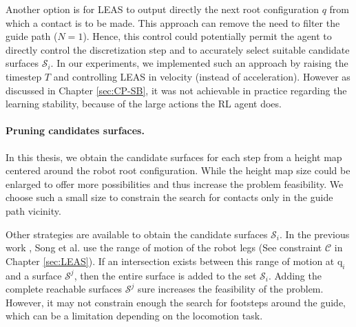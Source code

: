 Another option is for LEAS to output directly the next root configuration $q$ from which a contact is to be made.
This approach can remove the need to filter the guide path ($N=1$).
Hence, this control could potentially permit the agent to directly control the discretization step and to accurately select suitable candidate surfaces $\mathcal{S}_i$.
In our experiments, we implemented such an approach by raising the timestep $T$ and controlling LEAS in velocity (instead of acceleration). 
However as discussed in Chapter \ref{sec:CP-SB}, it was not achievable in practice regarding the learning stability, because of the large actions the RL agent does.

\paragraph{Pruning candidates surfaces.\label{subsub:mip:discussion:candidate_surfaces}}
In this thesis, we obtain the candidate surfaces for each step from a height map centered around the robot root configuration. While the height map size could be enlarged to offer more possibilities and thus increase the problem feasibility.
We choose such a small size to constrain the search for contacts only in the guide path vicinity.

Other strategies are available to obtain the candidate surfaces $\mathcal{S}_i$.
In the previous work \cite{sl1m_v2}, Song et al. use the range of motion of the robot legs (See constraint $\mathcal{C}$ in Chapter \ref{sec:LEAS}).
If an intersection exists between this range of motion at $\mbox{q}_i$ and a surface $\mathcal{S}^j$, then the entire surface is added to the set $\mathcal{S}_i$.
Adding the complete reachable surfaces $\mathcal{S}^j$ sure increases the feasibility of the problem. 
However, it may not constrain enough the search for footsteps around the guide, which can be a limitation depending on the locomotion task.


